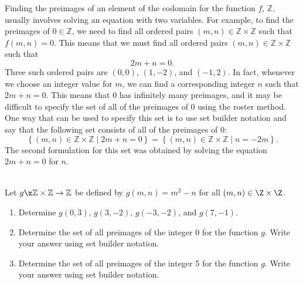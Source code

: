 Finding the preimages of an element of the codomain for the function $f$, $\mathbb{Z}$, usually involves solving an equation with two variables.  For example, to find the preimages of  $0 \in \mathbb{Z}$, we need to find all ordered pairs  $\left( {m, n} \right) \in \mathbb{Z} \times \mathbb{Z}$ such that 
$f( {m, n} ) = 0$.  This means that we must find all ordered pairs  $\left( {m, n} \right) \in \mathbb{Z} \times \mathbb{Z}$ such that
\[
2m + n = 0.
\]
Three such ordered pairs are  $\left( {0, 0} \right)$, $\left( {1,  - 2} \right)$, and  $\left( { - 1, 2} \right)$.  In fact, whenever we choose an integer value for  $m$, we can find a corresponding integer  $n$  such that  $2m + n = 0$.  This means that  0  has infinitely many preimages, and it may be difficult to specify the set of all of the preimages of 0 using the roster method.  One way that can be used to specify this set is to use set builder notation and say that the following set consists of all of the preimages of 0:
\[
\left\{ { {\left( {m, n} \right) \in \mathbb{Z} \times \mathbb{Z} } \mid 2m + n = 0} \right\} = \left\{ { {\left( {m, n} \right) \in \mathbb{Z} \times \mathbb{Z} } \mid n =  - 2m} \right\}\!.
\]
The second formulation for this set was obtained by solving the equation  
\linebreak $2m + n = 0$
for  $n$.
\hbreak

\begin{prog} \label{pr:function-two} \hfill \\
Let $g\x \mathbb{Z} \times \mathbb{Z} \to \mathbb{Z}$ be defined by  
$g( {m, n} ) = m^2 - n$ for all $\left(m, n \right) \in \Z \times \Z$.

\begin{enumerate}
\item Determine $g(0, 3)$, $g(3,-2)$, $g(-3, -2)$, and $g(7, -1)$.
\item Determine the set of all preimages of the integer 0 for the function $g$.  Write your answer using set builder notation.
\item Determine the set of all preimages of the integer 5 for the function $g$.  Write your answer using set builder notation.
\end{enumerate}

\end{prog}
\hbreak

\endinput
